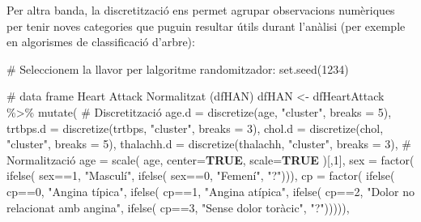 \documentclass[
]{article}
\newenvironment{Shaded}{\begin{snugshade}}{\end{snugshade}}
\newcommand{\AttributeTok}[1]{\textcolor[rgb]{0.80,0.80,0.80}{#1}}
\newcommand{\CommentTok}[1]{\textcolor[rgb]{0.50,0.62,0.50}{#1}}
\newcommand{\ConstantTok}[1]{\textcolor[rgb]{0.86,0.64,0.64}{\textbf{#1}}}
\newcommand{\DecValTok}[1]{\textcolor[rgb]{0.86,0.86,0.80}{#1}}
\newcommand{\FunctionTok}[1]{\textcolor[rgb]{0.94,0.94,0.56}{#1}}
\newcommand{\NormalTok}[1]{\textcolor[rgb]{0.80,0.80,0.80}{#1}}
\newcommand{\OtherTok}[1]{\textcolor[rgb]{0.94,0.94,0.56}{#1}}
\newcommand{\SpecialCharTok}[1]{\textcolor[rgb]{0.86,0.64,0.64}{#1}}
\newcommand{\StringTok}[1]{\textcolor[rgb]{0.80,0.58,0.58}{#1}}
\begin{document}
Per altra banda, la discretització ens permet agrupar observacions
numèriques per tenir noves categories que puguin resultar útils durant
l'anàlisi (per exemple en algorismes de classificació d'arbre):

\begin{Shaded}
\begin{Highlighting}[]
\CommentTok{\# Seleccionem la llavor per l\textquotesingle{}algoritme randomitzador:}
\FunctionTok{set.seed}\NormalTok{(}\DecValTok{1234}\NormalTok{)}

\CommentTok{\# data frame Heart Attack Normalitzat (dfHAN)}
\NormalTok{dfHAN }\OtherTok{\textless{}{-}}\NormalTok{ dfHeartAttack }\SpecialCharTok{\%\textgreater{}\%} 
  \FunctionTok{mutate}\NormalTok{( }\CommentTok{\# Discretització}
          \AttributeTok{age.d =} \FunctionTok{discretize}\NormalTok{(age, }\StringTok{"cluster"}\NormalTok{, }\AttributeTok{breaks =} \DecValTok{5}\NormalTok{),}
          \AttributeTok{trtbps.d =} \FunctionTok{discretize}\NormalTok{(trtbps, }\StringTok{"cluster"}\NormalTok{, }\AttributeTok{breaks =} \DecValTok{3}\NormalTok{),}
          \AttributeTok{chol.d =} \FunctionTok{discretize}\NormalTok{(chol, }\StringTok{"cluster"}\NormalTok{, }\AttributeTok{breaks =} \DecValTok{5}\NormalTok{),}
          \AttributeTok{thalachh.d =} \FunctionTok{discretize}\NormalTok{(thalachh, }\StringTok{"cluster"}\NormalTok{, }\AttributeTok{breaks =} \DecValTok{3}\NormalTok{),}
          \CommentTok{\#  Normalització}
          \AttributeTok{age =} \FunctionTok{scale}\NormalTok{( age, }\AttributeTok{center=}\ConstantTok{TRUE}\NormalTok{, }\AttributeTok{scale=}\ConstantTok{TRUE}\NormalTok{ )[,}\DecValTok{1}\NormalTok{],}
          \AttributeTok{sex =} \FunctionTok{factor}\NormalTok{( }\FunctionTok{ifelse}\NormalTok{( sex}\SpecialCharTok{==}\DecValTok{1}\NormalTok{, }\StringTok{"Masculí"}\NormalTok{, }
                          \FunctionTok{ifelse}\NormalTok{( sex}\SpecialCharTok{==}\DecValTok{0}\NormalTok{, }\StringTok{"Femení"}\NormalTok{, }\StringTok{"?"}\NormalTok{))),}
          \AttributeTok{cp =} \FunctionTok{factor}\NormalTok{( }\FunctionTok{ifelse}\NormalTok{( cp}\SpecialCharTok{==}\DecValTok{0}\NormalTok{, }\StringTok{"Angina típica"}\NormalTok{,}
                         \FunctionTok{ifelse}\NormalTok{( cp}\SpecialCharTok{==}\DecValTok{1}\NormalTok{, }\StringTok{"Angina atípica"}\NormalTok{,}
                         \FunctionTok{ifelse}\NormalTok{( cp}\SpecialCharTok{==}\DecValTok{2}\NormalTok{, }\StringTok{"Dolor no relacionat amb angina"}\NormalTok{,}
                         \FunctionTok{ifelse}\NormalTok{( cp}\SpecialCharTok{==}\DecValTok{3}\NormalTok{, }\StringTok{"Sense dolor toràcic"}\NormalTok{, }\StringTok{"?"}\NormalTok{))))),}

\end{Highlighting}
\end{Shaded}
\end{document}
